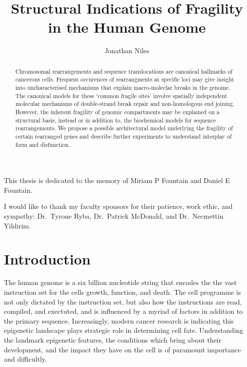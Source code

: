 \documentclass[phd,tocprelim]{cornell}
\title{Structural Indications of Fragility in the Human Genome}
\author{Jonathan Niles}
\begin{document}
\maketitle
\makecopyright%

\begin{abstract}
Chromosomal rearrangements and sequence translocations are canonical hallmarks of cancerous cells.  Frequent
occurences of rearrangments at specific loci may give insight into uncharacterised mechanisms that explain
macro-moleclar breaks in the genome.  The canonical models for these `common fragile sites' involve spatially
independent molecular mechanisms of double-strand break repair and non-homologous end joining.  However, the
inherent fragility of genomic compartments may be explained on a structural basis, instead or in addition to,
the biochemical models for sequence rearrangements.  We propose a possible architectural model underlying the
fragility of certain rearranged genes and describe further experiments to understand interplay of form and
disfunction.
\end{abstract}

\begin{dedication}
  This thesis is dedicated to the memory of Miriam P Fountain and Daniel E Fountain.
\end{dedication}

\begin{acknowledgements}
I would like to thank my faculty sponsors for their patience, work ethic, and sympathy:
Dr.\ Tyrone Ryba, Dr.\ Patrick McDonald, and Dr.\ Necmettin Yildirim.
\end{acknowledgements}

\contentspage%
\tablelistpage%
\figurelistpage%

\normalspacing\setcounter{page}{1}
\pagestyle{cornell} \addtolength{\parskip}{0.5\baselineskip}

\chapter{Introduction}

The human genome is a six billion nucleotide string that encodes the
the vast instruction set for the cells growth, function, and death.  The cell
programme is not only dictated by the instruction set, but also
how the instructions are read, compiled, and exectuted, and is influenced
by a myriad of factors in addition to the primary sequence.  Increasingly,
modern cancer research is indicating this epigenetic landscape plays strategic
role in determining cell fate.  Understanding the landmark epigenetic features,
the conditions which bring about their development, and the impact they have on
the cell is of paramount importance and difficultly.
\end{document}
